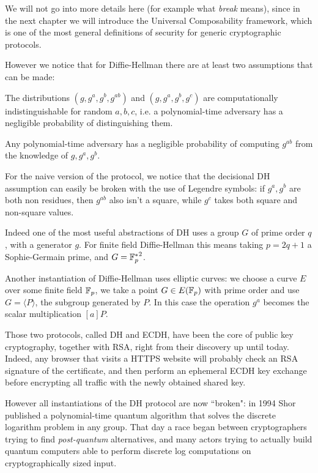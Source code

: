 We will not go into more details here (for example what \emph{break} means), since in the next chapter we will introduce the Universal Composability framework, which is one of the most general definitions of security for generic cryptographic protocols.

However we notice that for Diffie-Hellman there are at least two assumptions that can be made:
\begin{assumption}[DDH]
    The distributions $(g,g^a,g^b,g^{ab})$ and $(g,g^a,g^b,g^c)$ are computationally indistinguishable for random $a,b,c$, i.e. a polynomial-time adversary has a negligible probability of distinguishing them.
\end{assumption}
\begin{assumption}[CDH]
    Any polynomial-time adversary has a negligible probability of computing $g^{ab}$ from the knowledge of $g,g^a,g^b$.
\end{assumption}

For the naive version of the protocol, we notice that the decisional DH assumption can easily be broken with the use of Legendre symbols: if $g^a,g^b$ are both non residues, then $g^{ab}$ also isn't a square, while $g^c$ takes both square and non-square values.

Indeed one of the most useful abstractions of DH uses a group $G$ of prime order $q$, with a generator $g$. For finite field Diffie-Hellman this means taking $p=2q+1$ a Sophie-Germain prime, and $G={\mathbb{F}_p^\ast}^2$.

Another instantiation of Diffie-Hellman uses elliptic curves: we choose a curve $E$ over some finite field $\mathbb{F}_p$, we take a point $G\in E(\mathbb{F}_p)$ with prime order and use $G=\langle P\rangle$, the subgroup generated by $P$. In this case the operation $g^a$ becomes the scalar multiplication $[a]P$.

Those two protocols, called DH and ECDH, have been the core of public key cryptography, together with RSA, right from their discovery up until today. Indeed, any browser that visits a HTTPS website will probably check an RSA signature of the certificate, and then perform an ephemeral ECDH key exchange before encrypting all traffic with the newly obtained shared key.

However all instantiations of the DH protocol are now ``broken": in 1994 Shor published a polynomial-time quantum algorithm \cite{Shor94} that solves the discrete logarithm problem in any group. That day a race began between cryptographers trying to find \emph{post-quantum} alternatives, and many actors trying to actually build quantum computers able to perform discrete log computations on cryptographically sized input.


